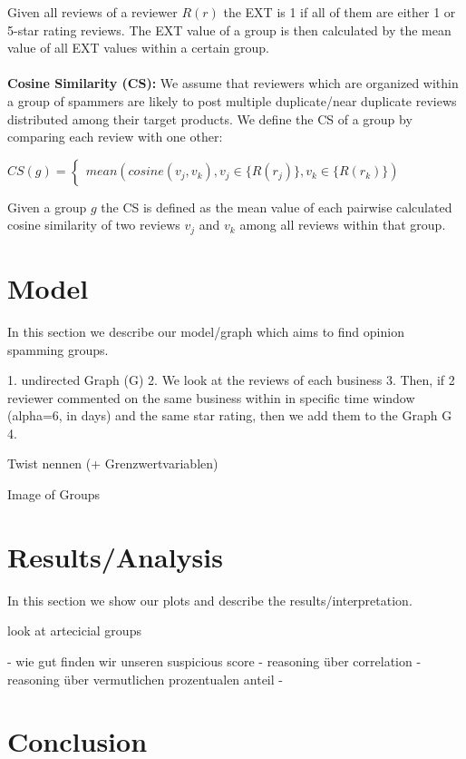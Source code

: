 \documentclass[conference]{IEEEtran}  %
\theoremstyle{plain}
\theoremstyle{definition}
\theoremstyle{remark}
\begin{document}
Given all reviews of a reviewer $R(r)$ the EXT is 1 if all of them are either 1 or 5-star rating reviews. The EXT value of a group is then calculated by the mean value of all EXT values within a certain group.  
\\
\\
\textbf{Cosine Similarity (CS):}
We assume that reviewers which are organized within a group of spammers are likely to post multiple duplicate/near duplicate reviews distributed among their target products. We define the CS of a group by comparing each review with one other: 

$
{CS(g)} = \begin{cases}
    mean(cosine(v_j, v_k), v_j \in \{ R(r_j)\},  v_k \in \{ R(r_k)\}) 
\end{cases}
$

Given a group $g$ the CS is defined as the mean value of each pairwise calculated cosine similarity of two reviews $v_j$ and $v_k$ among all reviews within that group. 





 
\section{Model}
\label{sec:model}

In this section we describe our model/graph which aims to find opinion spamming groups.

1. undirected Graph (G)
2. We look at the reviews of each business
3. Then, if 2 reviewer commented on the same business within in specific time window (alpha=6, in days) and the same star rating, then we add them to the Graph G 
4. 

Twist nennen (+ Grenzwertvariablen) 

Image of Groups


\section{Results/Analysis}
\label{sec:analysis}

In this section we show our plots and describe the results/interpretation. 

look at artecicial groups

- wie gut finden wir unseren suspicious score
- reasoning über correlation
- reasoning über vermutlichen prozentualen anteil
  - 




\section{Conclusion}
\label{sec:concl}
\end{document}
